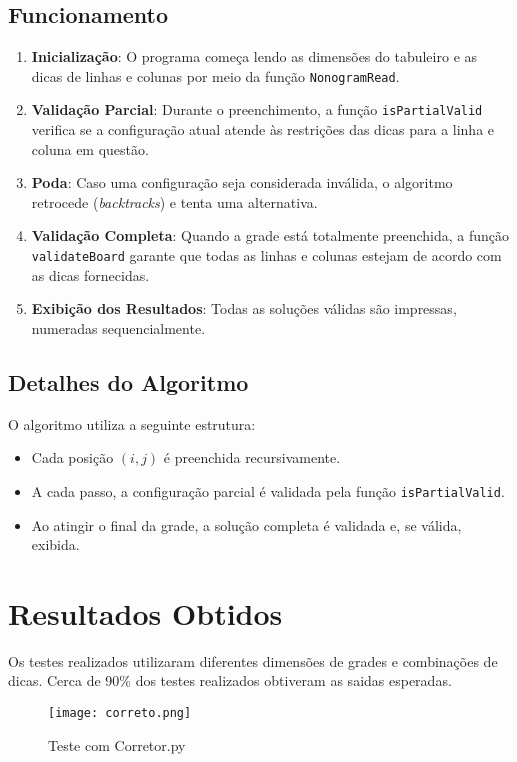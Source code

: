 \documentclass[a4paper,12pt]{article}
\begin{document}
\subsection{Funcionamento}
\begin{enumerate}
    \item \textbf{Inicializa\c{c}\~ao}: O programa come\c{c}a lendo as dimens\~oes do tabuleiro e as dicas de linhas e colunas por meio da fun\c{c}\~ao \texttt{NonogramRead}.
    \item \textbf{Validação Parcial}: Durante o preenchimento, a fun\c{c}\~ao \texttt{isPartialValid} verifica se a configura\c{c}\~ao atual atende \`as restri\c{c}\~oes das dicas para a linha e coluna em quest\~ao.
    \item \textbf{Poda}: Caso uma configura\c{c}\~ao seja considerada inv\'alida, o algoritmo retrocede (\textit{backtracks}) e tenta uma alternativa.
    \item \textbf{Validação Completa}: Quando a grade está totalmente preenchida, a fun\c{c}\~ao \texttt{validateBoard} garante que todas as linhas e colunas estejam de acordo com as dicas fornecidas.
    \item \textbf{Exibi\c{c}\~ao dos Resultados}: Todas as solu\c{c}\~oes v\'alidas s\~ao impressas, numeradas sequencialmente.
\end{enumerate}

\subsection{Detalhes do Algoritmo}
O algoritmo utiliza a seguinte estrutura:
\begin{itemize}
    \item Cada posi\c{c}\~ao \((i, j)\) \'{e} preenchida recursivamente.
    \item A cada passo, a configura\c{c}\~ao parcial \'e validada pela fun\c{c}\~ao \texttt{isPartialValid}.
    \item Ao atingir o final da grade, a solu\c{c}\~ao completa \'e validada e, se v\'alida, exibida.
\end{itemize}

\section{Resultados Obtidos}
Os testes realizados utilizaram diferentes dimens\~oes de grades e combina\c{c}\~oes de dicas. Cerca de 90\% dos testes realizados obtiveram as saidas esperadas. 

\begin{figure}[H]
    \centering
    \texttt{[image: correto.png]}
    \caption{Teste com Corretor.py}
\end{figure}
\end{document}

